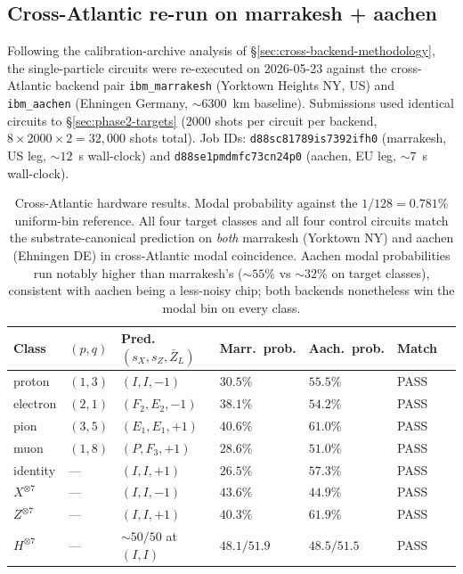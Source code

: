 \documentclass[11pt]{article}
\begin{document}
\subsection{Cross-Atlantic re-run on marrakesh + aachen}
\label{sec:phase2b-results}

Following the calibration-archive analysis of \S\ref{sec:cross-backend-methodology}, the single-particle circuits were re-executed on 2026-05-23 against the cross-Atlantic backend pair \texttt{ibm\_marrakesh} (Yorktown Heights NY, US) and \texttt{ibm\_aachen} (Ehningen Germany, $\sim 6300$~km baseline).  Submissions used identical circuits to \S\ref{sec:phase2-targets} ($2000$ shots per circuit per backend, $8 \times 2000 \times 2 = 32{,}000$ shots total).  Job IDs: \texttt{d88sc81789is7392ifh0} (marrakesh, US leg, $\sim 12$~s wall-clock) and \texttt{d88se1pmdmfc73cn24p0} (aachen, EU leg, $\sim 7$~s wall-clock).

\begin{table}[H]
\centering
\caption{Cross-Atlantic hardware results.  Modal probability against the $1 / 128 = 0.781\%$ uniform-bin reference.  All four target classes and all four control circuits match the substrate-canonical prediction on \emph{both} marrakesh (Yorktown NY) and aachen (Ehningen DE) in cross-Atlantic modal coincidence.  Aachen modal probabilities run notably higher than marrakesh's ($\sim 55\%$ vs $\sim 32\%$ on target classes), consistent with aachen being a less-noisy chip; both backends nonetheless win the modal bin on every class.}
\label{tab:phase2b-results}
\small
\begin{tabular}{lllllll}
\toprule
Class & $(p, q)$ & Pred. $(s_X, s_Z, \bar Z_L)$ & Marr.\ prob. & Aach.\ prob. & Match \\
\midrule
proton   & $(1, 3)$ & $(I, I, -1)$       & $30.5\%$ & $55.5\%$ & PASS \\
electron & $(2, 1)$ & $(F_2, E_2, -1)$   & $38.1\%$ & $54.2\%$ & PASS \\
pion     & $(3, 5)$ & $(E_1, E_1, +1)$   & $40.6\%$ & $61.0\%$ & PASS \\
muon     & $(1, 8)$ & $(P, F_3, +1)$     & $28.6\%$ & $51.0\%$ & PASS \\
\midrule
identity      & --- & $(I, I, +1)$                  & $26.5\%$ & $57.3\%$ & PASS \\
$X^{\otimes 7}$ & --- & $(I, I, -1)$                & $43.6\%$ & $44.9\%$ & PASS \\
$Z^{\otimes 7}$ & --- & $(I, I, +1)$                & $40.3\%$ & $61.9\%$ & PASS \\
$H^{\otimes 7}$ & --- & $\sim 50/50$ at $(I, I)$    & $48.1/51.9$ & $48.5/51.5$ & PASS \\
\bottomrule
\end{tabular}
\end{table}
\end{document}
